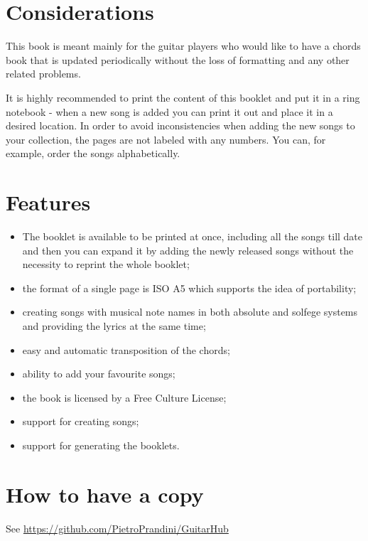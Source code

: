 %
%
%
%

\section*{Considerations}
This book is meant mainly for the guitar players who would like to have a chords book that is updated periodically without the loss of formatting and any other related problems.\par
It is highly recommended to print the content of this booklet and put it in a ring notebook - when a new song is added you can print it out and place it in a desired location. In order to avoid inconsistencies when adding the new songs to your collection, the pages are not labeled with any numbers. You can, for example, order the songs alphabetically.\par

\section*{Features}
\begin{itemize}
\item The booklet is available to be printed at once, including all the songs till date and then you can expand it by adding the newly released songs without the necessity to reprint the whole booklet;
\item the format of a single page is ISO A5 which supports the idea of  portability;
\item creating songs with musical note names in both absolute and solfege systems and providing the lyrics at the same time;
\item easy and automatic transposition of the chords;
\item ability to add your favourite songs;
\item the book is licensed by a Free Culture License;
\item support for creating songs;
\item support for generating the booklets.
\end{itemize}

\section*{How to have a copy}
See \href{https://github.com/PietroPrandini/GuitarHub}{https://github.com/PietroPrandini/GuitarHub}

\begin{center}
\end{center}
\newpage
